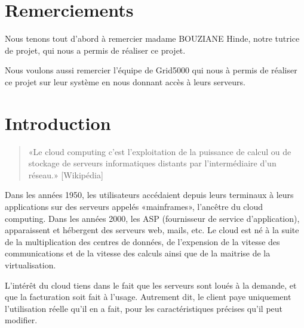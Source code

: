 \documentclass{report}
\title{%
    \begin{minipage}\linewidth
        \centering{
            RAPPORT DE PROJET \break
            "Cloud et virtualisation avec Openstack"
        }
    \end{minipage}
}
\author{%
    \begin{minipage}\linewidth
        \centering{Tutrice : BOUZIANE Hinde\break}
        \break
        \centering{
            Groupe : \break
            CULTY Alexandre,\break
            BENAIS Charles,\break
            BRESSAND Jérémy,\break
            ROGLIANO Théo
        }
        \break
    \end{minipage}
}
\date{2015 - 2016}
\begin{document}
\maketitle %

\large %

\newpage
\chapter*{Remerciements}
    Nous tenons tout d'abord à remercier madame BOUZIANE Hinde, notre tutrice de projet, qui nous a permis de réaliser ce projet.\break

    Nous voulons aussi remercier l'équipe de Grid5000 qui nous à permis de réaliser ce projet sur leur système en nous donnant accès à leurs serveurs.



\newpage
\chapter*{Introduction}
    \begin{quote}
        «Le cloud computing c'est l'exploitation de la puissance de calcul ou de stockage de serveurs informatiques distants par l'intermédiaire d'un réseau.» [Wikipédia]
    \end{quote}
    \bigbreak

    Dans les années 1950, les utilisateurs accédaient depuis leurs terminaux à leurs applications sur des serveurs appelés «mainframes», l'ancêtre du cloud computing.\break
    Dans les années 2000, les ASP (fournisseur de service d'application), apparaissent et hébergent des serveurs web, mails, etc.\break
    Le cloud est né à la suite de la multiplication des centres de données, de l'expension de la vitesse des communications et de la vitesse des calculs ainsi que de la maitrise de la virtualisation.\break

    L'intérêt du cloud tiens dans le fait que les serveurs sont loués à la demande, et que la facturation soit fait à l'usage. Autrement dit, le client paye uniquement l'utilisation réelle qu'il en a fait, pour les caractéristiques précises qu'il peut modifier.\break
    
\end{document}
